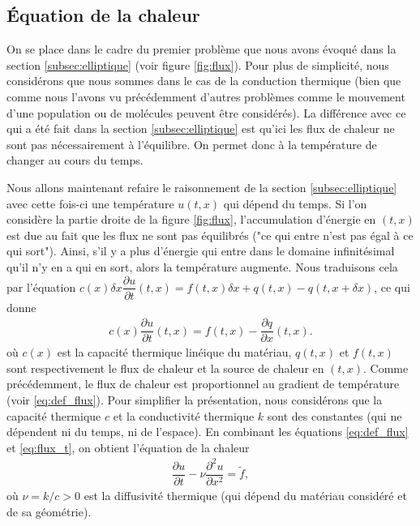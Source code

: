 \documentclass[12pt,a4paper,twoside]{article}
\begin{document}
\subsection{\'Equation de la chaleur}

On se place dans le cadre du premier probl\`eme que nous avons \'evoqu\'e dans
la section \ref{subsec:elliptique} (voir figure \ref{fig:flux}). 
Pour plus de simplicit\'e, nous consid\'erons que nous sommes dans le cas
de la conduction thermique (bien que comme nous l'avons vu pr\'ec\'edemment
d'autres probl\`emes comme le mouvement d'une population ou de mol\'ecules
peuvent \^etre consid\'er\'es).
La diff\'erence avec ce qui a \'et\'e fait dans la section \ref{subsec:elliptique}
est qu'ici les flux de chaleur ne sont pas n\'ecessairement \`a l'\'equilibre.
On permet donc \`a la temp\'erature de changer au cours du temps.

Nous allons maintenant refaire le raisonnement de la section \ref{subsec:elliptique}
avec cette fois-ci une temp\'erature $u(t,x)$ qui d\'epend du temps.
Si l'on consid\`ere la partie droite de la figure \ref{fig:flux}, l'accumulation
d'\'energie en $(t,x)$ est due au fait que les flux ne sont pas \'equilibr\'es
("ce qui entre n'est pas \'egal \`a ce qui sort").
Ainsi, s'il y a plus d'\'energie qui entre dans le domaine infinit\'esimal
qu'il n'y en a qui en sort,
alors la temp\'erature augmente.
Nous traduisons cela par l'\'equation
$c (x) \delta x \dfrac{\partial u}{\partial t}(t,x) = f(t,x) \delta x 
  + q(t,x) - q(t,x + \delta x)$, ce qui donne
\begin{align}
  \label{eq:flux_t}
  c (x) \dfrac{\partial u}{\partial t}(t,x) = f(t,x) - \dfrac{\partial q}{\partial x} (t,x) .
\end{align}
o\`u $c(x)$ est la capacit\'e thermique lin\'eique du mat\'eriau,
$q(t,x)$ et $f(t,x)$ sont respectivement le flux de chaleur 
et la source de chaleur en $(t,x)$.
Comme pr\'ec\'edemment, le flux de chaleur est proportionnel au gradient 
de temp\'erature (voir \eqref{eq:def_flux}).
Pour simplifier la pr\'esentation, nous consid\'erons que la capacit\'e
thermique $c$ et la conductivit\'e thermique $k$ sont des constantes 
(qui ne d\'ependent ni du temps, ni de l'espace).
En combinant les \'equations \eqref{eq:def_flux} et \eqref{eq:flux_t},
on obtient l'\'equation de la chaleur
\begin{align}
  \label{eq:chaleur}
  \dfrac{\partial u}{\partial t} - \nu \dfrac{\partial^2 u}{\partial x^2} = \widetilde{f} ,
\end{align}
o\`u $\nu = k/c > 0$ est la diffusivit\'e thermique 
(qui d\'epend du mat\'eriau consid\'er\'e et de sa g\'eom\'etrie).
\end{document}
